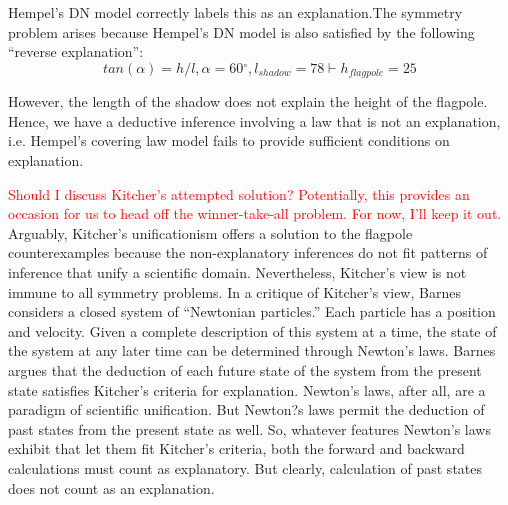 \documentclass{svjour3}                     %
\newcommand{\degree}{\ensuremath{^\circ}}
\begin{document}
Hempel's DN model correctly labels this as an explanation.The symmetry problem arises because Hempel's DN model is also satisfied by the following ``reverse explanation'':
\begin{equation} \label{eq:shadow_expl}
	tan(\alpha) = h/l, \alpha = 60  \degree, l_{shadow} = 78 \vdash h_{flagpole} = 25
\end{equation}

However, the length of the shadow does not explain the height of the flagpole. Hence, we have a deductive inference involving a law that is not an explanation, i.e. Hempel's covering law model fails to provide sufficient conditions on explanation.

\textcolor{red}{Should I discuss Kitcher's attempted solution? Potentially, this provides an occasion for us to head off the winner-take-all problem. For now, I'll keep it out.} Arguably, Kitcher's unificationism offers a solution to the flagpole counterexamples because the non-explanatory inferences do not fit patterns of inference that unify
a scientific domain. Nevertheless, Kitcher's view is not immune to all symmetry problems. In a critique of Kitcher's view, Barnes considers a closed system of ``Newtonian particles.''
Each particle has a position and velocity. Given a complete description of this system at a time, the state of the system at any later time can be determined through Newton's laws. Barnes argues that the deduction of each future state of the system from the present state satisfies Kitcher's criteria for explanation. Newton's laws, after all, are a paradigm of scientific unification. But Newton?s laws permit the deduction of past states from the present state as well. So, whatever features Newton's laws exhibit that let them fit Kitcher's criteria, both the forward and backward calculations must count as explanatory. But clearly, calculation of past states does not count as an explanation.
\end{document}
